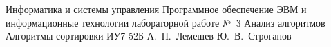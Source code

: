 \makereporttitle
    {Информатика и системы управления}
    {Программное обеспечение ЭВМ и информационные технологии}
    {лабораторной работе №~3}
    {Анализ алгоритмов}
    {Алгоритмы сортировки}
    {}
    {ИУ7-52Б}
    {А.~П.~Лемешев}
    {Ю.~В.~Строганов}
    {}
